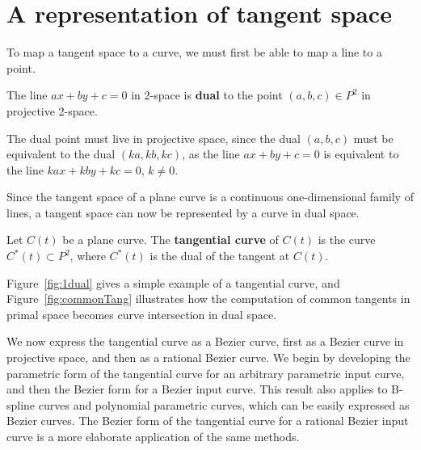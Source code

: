 \documentclass[10pt,twocolumn]{article}
\newif\ifVideo
\newif\ifTalk
\newcommand{\plucker}{Pl\"{u}cker\ }
\begin{document}
\ifVideo
  video: single curve and its dual (ob2.rawctr)
       tangent moving on curve with associated point moving on dual
\fi
\ifTalk
This is analogous to the appeal
of using the Fourier transform to shift to the frequency domain,
where the difficult operation of convolution 
becomes the simple operation of multiplication.
\fi
\ifVideo
  video: two curves in left window, their duals in right window:
       point moving on one of the dual curves with associated tangent
       moving on original curve, illustrating that as point nears intersection
       the tangent nears common tangency
\fi



\section{A representation of tangent space}
\label{sec:dual}

To map a tangent space to a curve, we must first be able to map a line to a point.

\begin{defn2}
\label{defn:dual}
The line $ax+by+c=0$ in 2-space is {\bf dual} to the point $(a,b,c) \in P^2$
in projective 2-space.
\end{defn2}
%
The dual point must live in projective space,
since the dual $(a,b,c)$ must be equivalent to the dual $(ka,kb,kc)$,
as the line $ax + by + c = 0$ is equivalent to the line
$kax + kby + kc = 0$, $k \neq 0$.

Since the tangent space of a plane curve is a continuous one-dimensional family 
of lines, a tangent space can now be represented by a curve in dual space.

\begin{defn2}
\label{defn:tangentialcurve}
Let $C(t)$ be a plane curve.
The {\bf tangential curve} of $C(t)$ is the curve $C^*(t) \subset P^2$,
where $C^*(t)$ is the dual of the tangent at $C(t)$.
\end{defn2}
%
Figure~\ref{fig:1dual} gives a simple example of a tangential curve, and
Figure~\ref{fig:commonTang} illustrates how the computation of 
common tangents in primal space becomes curve intersection in dual space.

We now express the tangential curve as a Bezier curve, 
first as a Bezier curve in projective space, and then as a rational Bezier curve.
We begin by developing the parametric form of the tangential curve for an arbitrary
parametric input curve, and then the Bezier form for a Bezier input curve.
This result also applies to B-spline curves and polynomial parametric curves,
which can be easily expressed as Bezier curves.
The Bezier form of the tangential curve for a rational Bezier input curve 
is a more elaborate application of the same methods.
\end{document}
